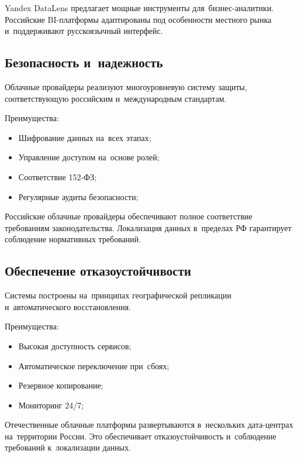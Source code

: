 \documentclass{ou}
\begin{document}
Yandex DataLens предлагает мощные инструменты для~бизнес-аналитики. Российские BI-платформы адаптированы под особенности местного рынка и~поддерживают русскоязычный интерфейс.
\subsection{Безопасность и~надежность}
Облачные провайдеры реализуют многоуровневую систему защиты, соответствующую российским и~международным стандартам.

Преимущества:
\begin{itemize}[label=-, itemindent=4em, nosep]
\item Шифрование данных на~всех этапах;
\item Управление доступом на~основе ролей;
\item Соответствие 152-ФЗ;
\item Регулярные аудиты безопасности;
\end{itemize}

Российские облачные провайдеры обеспечивают полное соответствие требованиям законодательства. Локализация данных в~пределах РФ гарантирует соблюдение нормативных требований.
\subsection{Обеспечение отказоустойчивости}
Системы построены на~принципах географической репликации и~автоматического восстановления.

Преимущества:
\begin{itemize}[label=-, itemindent=4em, nosep]
\item Высокая доступность сервисов;
\item Автоматическое переключение при~сбоях;
\item Резервное копирование;
\item Мониторинг 24/7;
\end{itemize}

Отечественные облачные платформы развертываются в~нескольких дата-центрах на~территории России. Это обеспечивает отказоустойчивость и~соблюдение требований к~локализации данных.
\newpage
{
\sloppy
\nocite{*}
\cleardoublepage
{}


}
\end{document}
